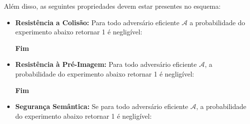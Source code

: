 \documentclass[a4paper]{article}
\begin{document}
Além disso, as seguintes propriedades devem estar presentes no
esquema:

\begin{itemize}
\item\textbf{Resistência a Colisão: }Para todo adversário eficiente
  $\mathcal{A}$ a probabilidade do experimento abaixo retornar 1 é
  negligível:

  \noindent
  \begin{algorithm}[H]
    \SetAlgoLined
     \textbf{Fim}
  \end{algorithm}

\item\textbf{Resistência à Pré-Imagem: }Para todo adversário eficiente
  $\mathcal{A}$, a probabilidade do experimento abaixo retornar 1 é
  negligível:

  \noindent
  \begin{algorithm}[H]
    \SetAlgoLined
     
    \textbf{Fim}
  \end{algorithm}

  
\item\textbf{Segurança Semântica: }Se para todo adversário eficiente
  $\mathcal{A}$, a probabilidade do experimento abaixo retornar 1 é
  negligível:

  \noindent
  \begin{algorithm}[H]
    \SetAlgoLined
     
  \end{algorithm}
\end{itemize}
\end{document}
